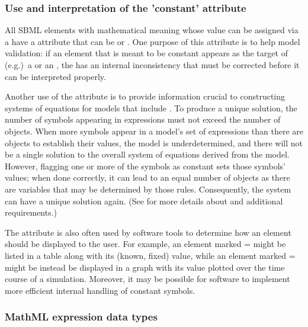 \subsubsection{Use and interpretation of the 'constant' attribute}
\label{sec:constant-flag}

All SBML elements with mathematical meaning whose value can be assigned via a \Rule have a  attribute that can be  or .  One purpose of this attribute is to help model validation: if an element that is meant to be constant appears as the target of (e.g.)\ a \RateRule or an \AssignmentRule, the \Model has an internal inconsistency that must be corrected before it can be interpreted properly.

Another use of the  attribute is to provide information crucial to constructing systems of equations for models that include \AlgebraicRule.  To produce a unique solution, the number of symbols appearing in \AlgebraicRule {} expressions must not exceed the number of \AlgebraicRule objects.  When more symbols appear in a model's set of \AlgebraicRule {} expressions than there are \AlgebraicRule objects to establish their values, the model is underdetermined, and there will not be a single solution to the overall system of equations derived from the model.  However, flagging one or more of the symbols as constant sets those symbols' values; when done correctly, it can lead to an equal number of \AlgebraicRule objects as there are variables that may be determined by those rules.  Consequently, the system can have a unique solution again.  (See  for more details about \AlgebraicRule and additional requirements.)

The  attribute is also often used by software tools to determine how an element should be displayed to the user.  For example, an element marked = might be listed in a table along with its (known, fixed) value, while an element marked = might be instead be displayed in a graph with its value plotted over the time course of a simulation.  Moreover, it may be possible for software to implement more efficient internal handling of constant symbols.


\subsubsection{MathML expression data types}
\label{sec:mathmltype}

